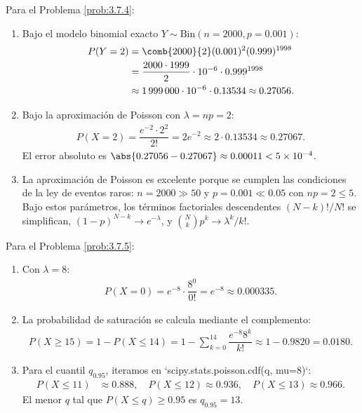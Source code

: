 \begin{solucion}
	\label{sol:3.7.4}
	Para el Problema \ref{prob:3.7.4}:
	\begin{enumerate}
		\item Bajo el modelo binomial exacto $Y \sim \text{Bin}(n = 2000, p = 0.001)$:
		\begin{align*}
			P(Y = 2) &= \comb{2000}{2}(0.001)^{2}(0.999)^{1998} \\
			&= \dfrac{2000 \cdot 1999}{2} \cdot 10^{-6} \cdot 0.999^{1998} \\
			&\approx 1\,999\,000 \cdot 10^{-6} \cdot 0.13534 \approx 0.27056.
		\end{align*}
		\item Bajo la aproximación de Poisson con $\lambda = np = 2$:
		\begin{align*}
			P(X = 2) = \dfrac{e^{-2} \cdot 2^{2}}{2!} = 2 e^{-2} \approx 2 \cdot 0.13534 \approx 0.27067.
		\end{align*}
		El error absoluto es $\abs{0.27056 - 0.27067} \approx 0.00011 < 5 \times 10^{-4}$.
		\item La aproximación de Poisson es excelente porque se cumplen las condiciones de la ley de eventos raros: $n = 2000 \gg 50$ y $p = 0.001 \ll 0.05$ con $np = 2 \le 5$. Bajo estos parámetros, los términos factoriales descendentes $(N-k)!/N!$ se simplifican, $(1-p)^{N-k} \to e^{-\lambda}$, y $\binom{N}{k} p^{k} \to \lambda^{k}/k!$.
	\end{enumerate}
\end{solucion}

\begin{solucion}
	\label{sol:3.7.5}
	Para el Problema \ref{prob:3.7.5}:
	\begin{enumerate}
		\item Con $\lambda = 8$:
		\begin{align*}
			P(X = 0) = e^{-8} \cdot \dfrac{8^{0}}{0!} = e^{-8} \approx 0.000335.
		\end{align*}
		\item La probabilidad de saturación se calcula mediante el complemento:
		\begin{align*}
			P(X \ge 15) = 1 - P(X \le 14) = 1 - \sum_{k=0}^{14} \dfrac{e^{-8} 8^{k}}{k!} \approx 1 - 0.9820 = 0.0180.
		\end{align*}
		\item Para el cuantil $q_{0.95}$, iteramos en `scipy.stats.poisson.cdf(q, mu=8)`:
		\begin{align*}
			P(X \le 11) &\approx 0.888, \quad P(X \le 12) \approx 0.936, \quad P(X \le 13) \approx 0.966.
		\end{align*}
		El menor $q$ tal que $P(X \le q) \ge 0.95$ es $q_{0.95} = 13$.
	\end{enumerate}
\end{solucion}

